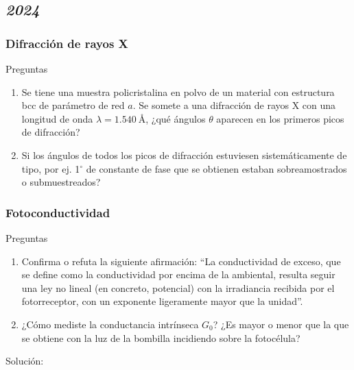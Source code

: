\subsection*{\textit{2024}}\begin{Enunciado}

	\subsubsection{Difracción de rayos X}
	Preguntas
	\begin{enumerate}[label=\alph*)]
		\item Se tiene una muestra policristalina en polvo de un material con estructura bcc de parámetro de red $a$. Se somete a una difracción de rayos X con una longitud de onda $\lambda = 1.540\ \text{\AA}$, ¿qué ángulos $\theta$ aparecen en los primeros picos de difracción?
		\item Si los ángulos de todos los picos de difracción estuviesen sistemáticamente de tipo, por ej. 1$^\circ$ de constante de fase que se obtienen estaban sobreamostrados o submuestreados?
	\end{enumerate}
\end{Enunciado}

\begin{Enunciado}
	\subsubsection{Fotoconductividad}
	Preguntas
	\begin{enumerate}[label=\alph*)]
		\item Confirma o refuta la siguiente afirmación: ``La conductividad de exceso, que se define como la conductividad por encima de la ambiental, resulta seguir una ley no lineal (en concreto, potencial) con la irradiancia recibida por el fotorreceptor, con un exponente ligeramente mayor que la unidad''.
		\item ¿Cómo mediste la conductancia intrínseca $G_0$? ¿Es mayor o menor que la que se obtiene con la luz de la bombilla incidiendo sobre la fotocélula?
	\end{enumerate}
\end{Enunciado}

Solución:

